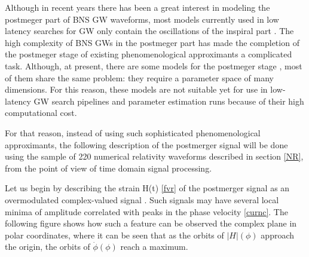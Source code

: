 Although in recent years there has been a great interest in modeling the postmeger part of BNS GW waveforms, most models currently used in low latency searches for GW only contain the oscillations of the inspiral part \cite{Hinderer:2009ca,Damour:2012yf,PhysRevD.96.121501,Dietrich:2018uni}. The high complexity of BNS GWs in the postmeger part has made the completion of the postmeger stage of existing phenomenological approximants a complicated task. Although, at present, there are some models for the postmeger stage \cite{Breschi:2019srl, Tsang:2019esi, Soultanis:2021oia, https://doi.org/10.48550/arxiv.2205.09112}, most of them share the same problem: they require a parameter space of many dimensions. For this reason, these models are not suitable yet for use in low-latency GW search pipelines and parameter estimation runs because of their high computational cost.

For that reason, instead of using such sophisticated phenomenological approximants, the following description of the postmerger signal will be done using the sample of 220 numerical relativity waveforms described in section \ref{NR}, from the point of view of time domain signal processing.

Let us begin by describing the strain H(t) \ref{fvr} of the postmerger signal as an overmodulated complex-valued signal \cite{Kastaun:2016elu}. Such signals may have several local minima of amplitude correlated with peaks in the phase velocity \ref{curnc}. The following figure shows how such a feature can be observed the complex plane in polar coordinates, where it can be seen that as the orbits of $|H|(\phi)$ approach the origin, the orbits of $\dot{\phi}(\phi)$ reach a maximum.



